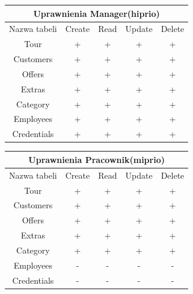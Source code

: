 \documentclass[polish,polish,a4paper]{article}
\begin{document}
\begin{center}
 \begin{tabular}{|c c c c c|} 
  \hline
 \multicolumn{5}{|c|}{Uprawnienia Manager(hiprio)} \\
 \hline
 Nazwa tabeli  & Create & Read & Update & Delete\\ [0.3ex] 
 \hline\hline
 Tour & + & +  & + & +\\ 
 \hline
 Customers  & +  & +  & +  & +  \\
 \hline
 Offers  & + & +  & +  & +\\
 \hline
 Extras  & +  & +  & +  & + \\
 \hline
 Category  & +  & +  & +  & + \\ [1ex] 
 \hline
 Employees  & +  & +  & +  & + \\ [1ex] 
 \hline
 Credentials  & +  & +  & +  & + \\ [1ex] 
 \hline
\end{tabular}
\end{center}

\begin{center}
 \begin{tabular}{|c c c c c|} 
  \hline
 \multicolumn{5}{|c|}{Uprawnienia Pracownik(miprio)} \\
 \hline
 Nazwa tabeli  & Create & Read & Update & Delete\\ [0.3ex] 
 \hline\hline
 Tour & + & +  & + & +\\ 
 \hline
 Customers  & +  & +  & +  & +  \\
 \hline
 Offers  & + & +  & +  & +\\
 \hline
 Extras  & +  & +  & +  & + \\
 \hline
 Category  & +  & +  & +  & + \\ [1ex] 
 \hline
 Employees  & -  & -  & -  & - \\ [1ex] 
 \hline
 Credentials  & -  & -  & -  & - \\ [1ex] 
 \hline
\end{tabular}
\end{center}
\end{document}
